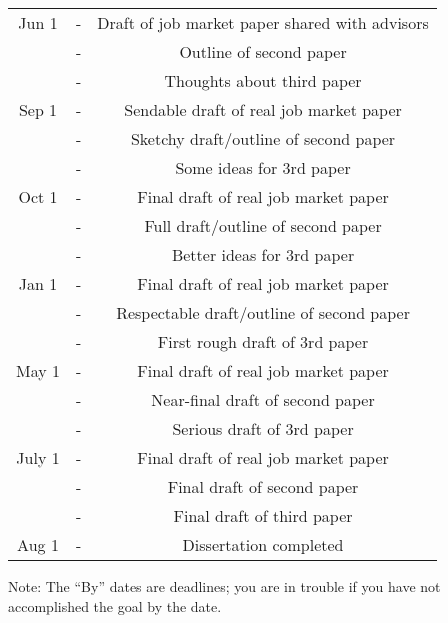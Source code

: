 \documentclass{\econtex}
\begin{document}
\begin{center}
\begin{tabular}{|ccc|}\hline
     Jun 1 & - & Draft of job market paper shared with advisors
\\       & - & Outline of second paper
\\       & - & Thoughts about third paper
\\   Sep 1 & - & Sendable draft of real job market paper
\\     & - & Sketchy draft/outline of second paper
\\     & - & Some ideas for 3rd paper
\\ Oct 1 & - & Final draft of real job market paper
\\     & - & Full draft/outline of second paper
\\     & - & Better ideas for 3rd paper
\\ Jan 1 & - & Final draft of real job market paper
\\     & - & Respectable draft/outline of second paper
\\     & - & First rough draft of 3rd paper
\\ May 1 & - & Final draft of real job market paper
\\     & - & Near-final draft of second paper
\\     & - & Serious draft of 3rd paper
\\ July 1 & - & Final draft of real job market paper
\\     & - & Final draft of second paper
\\     & - & Final draft of third paper
\\ Aug 1 & - & Dissertation completed
\\ \hline 
\end{tabular}
\end{center}
Note: The ``By'' dates are deadlines; you are in trouble if you have not
accomplished the goal by the date.
\end{document}
